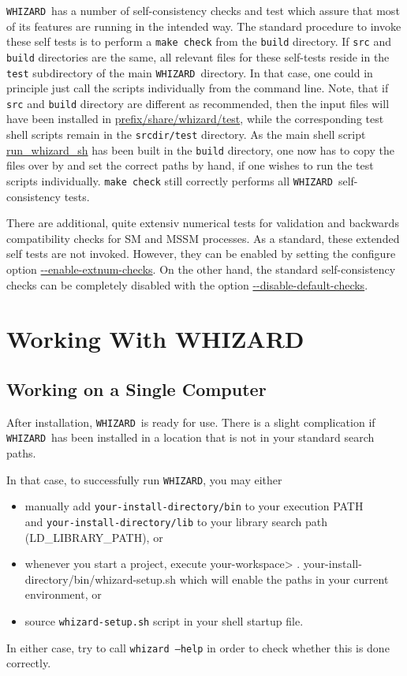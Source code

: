 \documentclass[12pt]{book}
\newenvironment{interaction}%
  {\begingroup\small
   \verbatim}%
  {\endverbatim
   \endgroup\noindent}
\newcommand{\ttt}[1]{\texttt{#1}}
\newcommand{\whizard}{\texttt{WHIZARD}}
\begin{document}
\whizard\ has a number of self-consistency checks and test which assure
that most of its features are running in the intended way. The
standard procedure to invoke these self tests is to perform a
\texttt{make check} from the \texttt{build} directory. If \texttt{src}
and \texttt{build} directories are the same, all relevant files for
these self-tests reside in the \texttt{test} subdirectory of the main
\whizard\ directory. In that case, one could in principle just call the
scripts individually from the command line. Note, that if \texttt{src}
and \texttt{build} directory are different as recommended, then the
input files will have been installed in
\url{prefix/share/whizard/test}, while the corresponding test shell
scripts remain in the \texttt{srcdir/test} directory. As the main shell
script \url{run_whizard_sh} has been built in the \texttt{build}
directory, one now has to copy the files over by and set the correct
paths by hand, if one wishes to run the test scripts individually. 
\texttt{make check} still correctly performs all \whizard\
self-consistency tests.

There are additional, quite extensiv numerical tests for validation
and backwards compatibility checks for SM and MSSM processes. As a
standard, these extended self tests are not invoked. However, they can
be enabled by setting the configure option
\url{--enable-extnum-checks}. On the other hand, the standard
self-consistency checks can be completely disabled with the option
\url{--disable-default-checks}. 


\section{Working With WHIZARD}

\subsection{Working on a Single Computer}
\label{sec:workspace}

After installation, \whizard\ is ready for use.  There is a slight
complication if \whizard\ has been installed in a location that is not
in your standard search paths.

In that case, to successfully run \whizard, you may either 
\begin{itemize}
\item
  manually add \ttt{your-install-directory/bin} to your execution PATH\\
  and \ttt{your-install-directory/lib} to your library search path
  (LD\_LIBRARY\_PATH), or
\item
  whenever you start a project, execute
  \begin{interaction}
    your-workspace> . your-install-directory/bin/whizard-setup.sh
  \end{interaction}
  which will enable the paths in your current environment, or
\item
  source \ttt{whizard-setup.sh} script in your shell startup file.
\end{itemize}
In either case, try to call \ttt{whizard --help} in order to check
whether this is done correctly.
\end{document}
